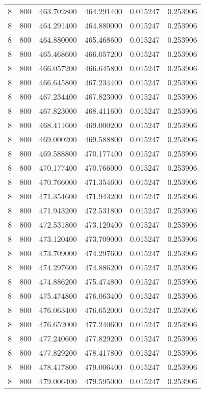 \begin{longtable}{rrrrrr}
8 & 800 & 463.702800 & 464.291400 & 0.015247 & 0.253906 \\
8 & 800 & 464.291400 & 464.880000 & 0.015247 & 0.253906 \\
8 & 800 & 464.880000 & 465.468600 & 0.015247 & 0.253906 \\
8 & 800 & 465.468600 & 466.057200 & 0.015247 & 0.253906 \\
8 & 800 & 466.057200 & 466.645800 & 0.015247 & 0.253906 \\
8 & 800 & 466.645800 & 467.234400 & 0.015247 & 0.253906 \\
8 & 800 & 467.234400 & 467.823000 & 0.015247 & 0.253906 \\
8 & 800 & 467.823000 & 468.411600 & 0.015247 & 0.253906 \\
8 & 800 & 468.411600 & 469.000200 & 0.015247 & 0.253906 \\
8 & 800 & 469.000200 & 469.588800 & 0.015247 & 0.253906 \\
8 & 800 & 469.588800 & 470.177400 & 0.015247 & 0.253906 \\
8 & 800 & 470.177400 & 470.766000 & 0.015247 & 0.253906 \\
8 & 800 & 470.766000 & 471.354600 & 0.015247 & 0.253906 \\
8 & 800 & 471.354600 & 471.943200 & 0.015247 & 0.253906 \\
8 & 800 & 471.943200 & 472.531800 & 0.015247 & 0.253906 \\
8 & 800 & 472.531800 & 473.120400 & 0.015247 & 0.253906 \\
8 & 800 & 473.120400 & 473.709000 & 0.015247 & 0.253906 \\
8 & 800 & 473.709000 & 474.297600 & 0.015247 & 0.253906 \\
8 & 800 & 474.297600 & 474.886200 & 0.015247 & 0.253906 \\
8 & 800 & 474.886200 & 475.474800 & 0.015247 & 0.253906 \\
8 & 800 & 475.474800 & 476.063400 & 0.015247 & 0.253906 \\
8 & 800 & 476.063400 & 476.652000 & 0.015247 & 0.253906 \\
8 & 800 & 476.652000 & 477.240600 & 0.015247 & 0.253906 \\
8 & 800 & 477.240600 & 477.829200 & 0.015247 & 0.253906 \\
8 & 800 & 477.829200 & 478.417800 & 0.015247 & 0.253906 \\
8 & 800 & 478.417800 & 479.006400 & 0.015247 & 0.253906 \\
8 & 800 & 479.006400 & 479.595000 & 0.015247 & 0.253906 \\

\end{longtable}
